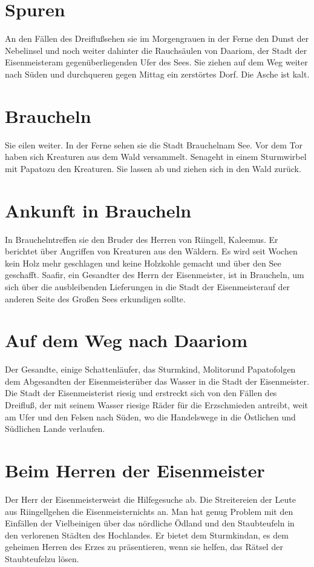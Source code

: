 \documentclass[12pt,a4paper,onecolumn,twoside,ngerman]{book}
\newcommand{\Molitor}{Molitor}
\newcommand{\Sena}{Sena}
\newcommand{\Sturmkind}{Sturmkind}
\newcommand{\Papato}{Papato}
\newcommand{\Schattenlaufer}{Schattenläufer}
\newcommand{\Rhingell}{Riingell}
\newcommand{\Kalemus}{Kaleemus}
\newcommand{\Dreifluss}{Dreifluß}
\newcommand{\Braucheln}{Braucheln}
\newcommand{\Eisenmeister}{Eisenmeister}
\newcommand{\Dariom}{Daariom}
\newcommand{\Safir}{Saafir}
\newcommand{\Staubteufel}{Staubteufel}
\begin{document}
\section{Spuren}
An den Fällen des \Dreifluss  sehen sie im Morgengrauen in der Ferne den Dunst der Nebelinsel und noch weiter dahinter die Rauchsäulen von \Dariom , der Stadt der \Eisenmeister  am gegenüberliegenden Ufer des Sees. Sie ziehen auf dem Weg weiter nach Süden und durchqueren gegen Mittag ein zerstörtes Dorf. Die Asche ist kalt.

\section{\Braucheln}
Sie eilen weiter. In der Ferne sehen sie die Stadt \Braucheln  am See. Vor dem Tor haben sich Kreaturen aus dem Wald versammelt. \Sena  geht in einem Sturmwirbel mit \Papato  zu den Kreaturen. Sie lassen ab und ziehen sich in den Wald zurück.

\section{Ankunft in \Braucheln}
In \Braucheln  treffen sie den Bruder des Herren von \Rhingell , \Kalemus . Er berichtet über Angriffen von Kreaturen aus den Wäldern. Es wird seit Wochen kein Holz mehr geschlagen und keine Holzkohle gemacht und über den See geschafft.  \Safir , ein Gesandter des Herrn der \Eisenmeister , ist in \Braucheln , um sich über die ausbleibenden Lieferungen in die Stadt der \Eisenmeister  auf der anderen Seite des Großen Sees erkundigen sollte.

\section{Auf dem Weg nach \Dariom}
Der Gesandte, einige \Schattenlaufer , das \Sturmkind , \Molitor  und \Papato  folgen dem Abgesandten der \Eisenmeister  über das Wasser in die Stadt der \Eisenmeister .
Die Stadt der \Eisenmeister ist riesig und erstreckt sich von den Fällen des \Dreifluss , der mit seinem Wasser riesige Räder für die Erzschmieden antreibt, weit am Ufer und den Felsen nach Süden, wo die Handelswege in die Östlichen und Südlichen Lande verlaufen.

\section{Beim Herren der \Eisenmeister}
Der Herr der \Eisenmeister  weist die Hilfegesuche ab. Die Streitereien der Leute aus \Rhingell  gehen die \Eisenmeister  nichts an. Man hat genug Problem mit den Einfällen der Vielbeinigen über das nördliche Ödland und den \Staubteufel n in den verlorenen Städten des Hochlandes. 
Er bietet dem \Sturmkind an, es dem geheimen Herren des Erzes zu präsentieren, wenn sie helfen, das Rätsel der \Staubteufel zu lösen.
\end{document}
